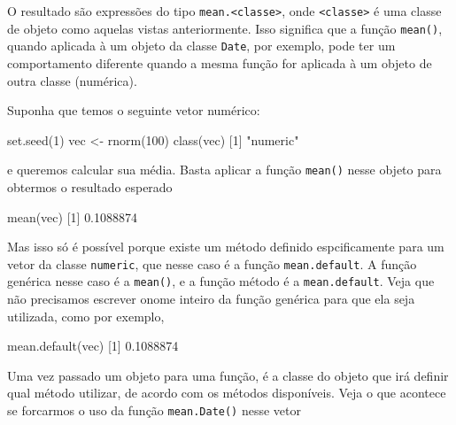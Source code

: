 \documentclass[
  10pt,
  a4paper]{book}
\newenvironment{Shaded}{\begin{snugshade}}{\end{snugshade}}
\newcommand{\DecValTok}[1]{\textcolor[rgb]{0.00,0.00,0.81}{#1}}
\newcommand{\FloatTok}[1]{\textcolor[rgb]{0.00,0.00,0.81}{#1}}
\newcommand{\FunctionTok}[1]{\textcolor[rgb]{0.00,0.00,0.00}{#1}}
\newcommand{\NormalTok}[1]{#1}
\newcommand{\OtherTok}[1]{\textcolor[rgb]{0.56,0.35,0.01}{#1}}
\newcommand{\StringTok}[1]{\textcolor[rgb]{0.31,0.60,0.02}{#1}}
\begin{document}
O resultado são expressões do tipo \texttt{mean.\textless{}classe\textgreater{}}, onde \texttt{\textless{}classe\textgreater{}} é
uma classe de objeto como aquelas vistas anteriormente. Isso significa
que a função \texttt{mean()}, quando aplicada à um objeto da classe \texttt{Date}, por
exemplo, pode ter um comportamento diferente quando a mesma função for
aplicada à um objeto de outra classe (numérica).

Suponha que temos o seguinte vetor numérico:

\begin{Shaded}
\begin{Highlighting}[]
\FunctionTok{set.seed}\NormalTok{(}\DecValTok{1}\NormalTok{)}
\NormalTok{vec }\OtherTok{\textless{}{-}} \FunctionTok{rnorm}\NormalTok{(}\DecValTok{100}\NormalTok{)}
\FunctionTok{class}\NormalTok{(vec)}
\NormalTok{[}\DecValTok{1}\NormalTok{] }\StringTok{"numeric"}
\end{Highlighting}
\end{Shaded}

e queremos calcular sua média. Basta aplicar a função \texttt{mean()} nesse
objeto para obtermos o resultado esperado

\begin{Shaded}
\begin{Highlighting}[]
\FunctionTok{mean}\NormalTok{(vec)}
\NormalTok{[}\DecValTok{1}\NormalTok{] }\FloatTok{0.1088874}
\end{Highlighting}
\end{Shaded}

Mas isso só é possível porque existe um método definido espcificamente
para um vetor da classe \texttt{numeric}, que nesse caso é a função
\texttt{mean.default}. A função genérica nesse caso é a \texttt{mean()}, e a função
método é a \texttt{mean.default}. Veja que não precisamos escrever onome
inteiro da função genérica para que ela seja utilizada, como por exemplo,

\begin{Shaded}
\begin{Highlighting}[]
\FunctionTok{mean.default}\NormalTok{(vec)}
\NormalTok{[}\DecValTok{1}\NormalTok{] }\FloatTok{0.1088874}
\end{Highlighting}
\end{Shaded}

Uma vez passado um objeto para uma função, é a classe do objeto que irá
definir qual método utilizar, de acordo com os métodos disponíveis. Veja
o que acontece se forcarmos o uso da função \texttt{mean.Date()} nesse vetor
\end{document}
